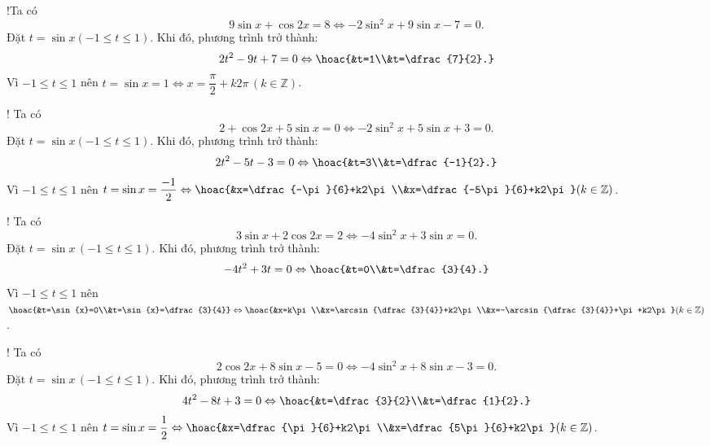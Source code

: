 \begin{bt}
{\begin{listEX}[2]
			\item!Ta có
			$$
			9\sin{x}+\cos{2x}=8
			\Leftrightarrow -2\sin^2{x}+9\sin{x}-7=0.
			$$
			Đặt $t=\sin{x}(-1\le t\le 1)$. Khi đó, phương trình trở thành:
			$$
			2t^2-9t+7=0 \Leftrightarrow \hoac{&t=1\\&t=\dfrac{7}{2}.}
			$$
			Vì $-1\le t\le 1$ nên $t=\sin{x}=1\Leftrightarrow x=\dfrac{\pi}{2}+k2\pi\,(k\in\mathbb{Z})$.
			\item! Ta có
			$$
			2+\cos{2x}+5\sin{x}=0 \Leftrightarrow -2\sin^2{x}+5\sin{x}+3=0.
			$$
			Đặt $t=\sin{x}(-1\le t\le 1)$. Khi đó, phương trình trở thành:
			$$
			2t^2-5t-3=0 \Leftrightarrow \hoac{&t=3\\&t=\dfrac{-1}{2}.}
			$$
			Vì $-1\le t\le 1$ nên $t=\sin{x}=\dfrac{-1}{2}\Leftrightarrow\hoac{&x=\dfrac{-\pi}{6}+k2\pi\\&x=\dfrac{-5\pi}{6}+k2\pi}(k\in\mathbb{Z})$.
			\item! Ta có
			$$
			3\sin{x}+2\cos{2x}=2 \Leftrightarrow -4\sin^2{x}+3\sin{x}=0.
			$$
			Đặt $t=\sin{x}\,(-1\le t\le 1)$. Khi đó, phương trình trở thành:
			$$
			-4t^2+3t=0 \Leftrightarrow \hoac{&t=0\\&t=\dfrac{3}{4}.}
			$$
			Vì $-1\le t\le 1$ nên $\hoac{&t=\sin{x}=0\\&t=\sin{x}=\dfrac{3}{4}}\Leftrightarrow \hoac{&x=k\pi\\&x=\arcsin{\dfrac{3}{4}}+k2\pi\\&x=-\arcsin{\dfrac{3}{4}}+\pi+k2\pi}(k\in\mathbb{Z})$.
			\item! Ta có
			$$
			2\cos{2x}+8\sin{x}-5=0 \Leftrightarrow -4\sin^2{x}+8\sin{x}-3=0.
			$$
			Đặt $t=\sin{x}\,(-1\le t\le 1)$. Khi đó, phương trình trở thành:
			$$
			4t^2-8t+3=0 \Leftrightarrow \hoac{&t=\dfrac{3}{2}\\&t=\dfrac{1}{2}.}
			$$
			Vì $-1\le t\le 1$ nên $t=\sin{x}=\dfrac{1}{2}\Leftrightarrow\hoac{&x=\dfrac{\pi}{6}+k2\pi\\&x=\dfrac{5\pi}{6}+k2\pi}(k\in\mathbb{Z})$.
		\end{listEX}
	}
\end{bt}

